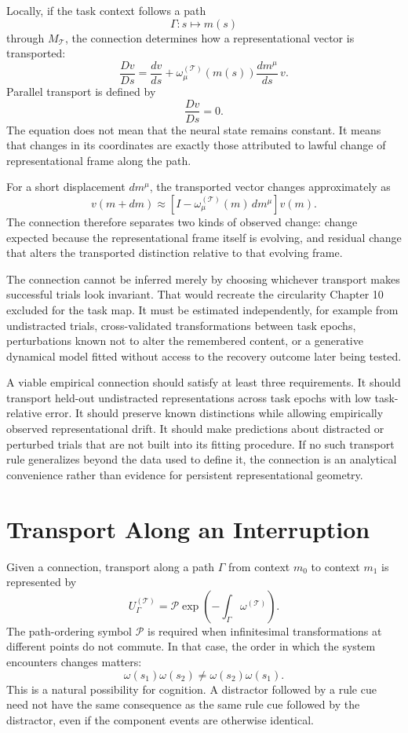 \documentclass[11pt]{book}
\begin{document}
Locally, if the task context follows a path
\[
\Gamma:s\longmapsto m(s)
\]
through $M_{\mathcal T}$, the connection determines how a representational vector is transported:
\[
\frac{D v}{Ds}
=
\frac{dv}{ds}
+
\omega^{(\mathcal T)}_{\mu}(m(s))
\frac{dm^{\mu}}{ds}\,v.
\]
Parallel transport is defined by
\[
\frac{D v}{Ds}=0.
\]
The equation does not mean that the neural state remains constant. It means that changes in its coordinates are exactly those attributed to lawful change of representational frame along the path.

For a short displacement $dm^\mu$, the transported vector changes approximately as
\[
v(m+dm)
\approx
\left[
I-
\omega^{(\mathcal T)}_{\mu}(m)\,dm^\mu
\right]v(m).
\]
The connection therefore separates two kinds of observed change: change expected because the representational frame itself is evolving, and residual change that alters the transported distinction relative to that evolving frame.

The connection cannot be inferred merely by choosing whichever transport makes successful trials look invariant. That would recreate the circularity Chapter 10 excluded for the task map. It must be estimated independently, for example from undistracted trials, cross-validated transformations between task epochs, perturbations known not to alter the remembered content, or a generative dynamical model fitted without access to the recovery outcome later being tested.

A viable empirical connection should satisfy at least three requirements. It should transport held-out undistracted representations across task epochs with low task-relative error. It should preserve known distinctions while allowing empirically observed representational drift. It should make predictions about distracted or perturbed trials that are not built into its fitting procedure. If no such transport rule generalizes beyond the data used to define it, the connection is an analytical convenience rather than evidence for persistent representational geometry.

\section*{Transport Along an Interruption}

Given a connection, transport along a path $\Gamma$ from context $m_0$ to context $m_1$ is represented by
\[
U_{\Gamma}^{(\mathcal T)}
=
\mathcal P
\exp\left(
-\int_{\Gamma}\omega^{(\mathcal T)}
\right).
\]
The path-ordering symbol $\mathcal P$ is required when infinitesimal transformations at different points do not commute. In that case, the order in which the system encounters changes matters:
\[
\omega(s_1)\omega(s_2)
\neq
\omega(s_2)\omega(s_1).
\]
This is a natural possibility for cognition. A distractor followed by a rule cue need not have the same consequence as the same rule cue followed by the distractor, even if the component events are otherwise identical.
\end{document}
